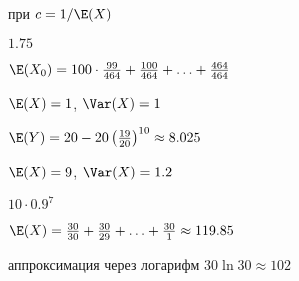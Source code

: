 \begin{solution}{5.7}
\end{solution}
\begin{solution}{5.8}
\end{solution}
\begin{solution}{5.9}
\end{solution}
\begin{solution}{5.10}
\end{solution}
\begin{solution}{5.11}
\end{solution}
\begin{solution}{5.12}
при $c=1/\E(X)$
\end{solution}
\begin{solution}{5.13}
\end{solution}
\begin{solution}{5.14}
\end{solution}
\begin{solution}{5.15}
\end{solution}
\begin{solution}{5.16}
\end{solution}
\begin{solution}{6.1}
\end{solution}
\begin{solution}{6.2}
\end{solution}
\begin{solution}{6.3}
$1.75$
\end{solution}
\begin{solution}{6.4}
  $\E(X_0)=100\cdot \frac{99}{464} + \frac{100}{464} + \ldots + \frac{464}{464}$
\end{solution}
\begin{solution}{6.5}
\end{solution}
\begin{solution}{6.6}
$\E(X)=1$, $\Var(X)=1$
\end{solution}
\begin{solution}{6.7}
$\E(Y)=20-20 \left( \frac{19}{20} \right)^{10}\approx 8.025$
\end{solution}
\begin{solution}{6.8}
$\E(X)=9$, $\Var(X)=1.2$
\end{solution}
\begin{solution}{6.9}
  $10 \cdot 0.9^7$
\end{solution}
\begin{solution}{6.10}
  $\E(X)=\frac{30}{30} + \frac{30}{29} + \ldots + \frac{30}{1}\approx 119.85$

  аппроксимация через логарифм $30 \ln 30 \approx 102$
\end{solution}
